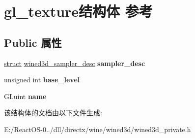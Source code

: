 \hypertarget{structgl__texture}{}\section{gl\+\_\+texture结构体 参考}
\label{structgl__texture}
\subsection*{Public 属性}
\begin{DoxyCompactItemize}
\item 
\mbox{\label{structgl__texture_a0a2587064f8831daf5edebd034b7a7ac}} 
\hyperlink{interfacestruct}{struct} \hyperlink{structwined3d__sampler__desc}{wined3d\+\_\+sampler\+\_\+desc} {\bfseries sampler\+\_\+desc}
\item 
\mbox{\label{structgl__texture_ac9259d806c83a93be41b669c81cbc527}} 
unsigned int {\bfseries base\+\_\+level}
\item 
\mbox{\label{structgl__texture_abbbbf5ff963da6a8fcd5c8df5f20744c}} 
G\+Luint {\bfseries name}
\end{DoxyCompactItemize}


该结构体的文档由以下文件生成\+:\begin{DoxyCompactItemize}
\item 
E\+:/\+React\+O\+S-\/0../dll/directx/wine/wined3d/wined3d\+\_\+private.\+h\end{DoxyCompactItemize}
